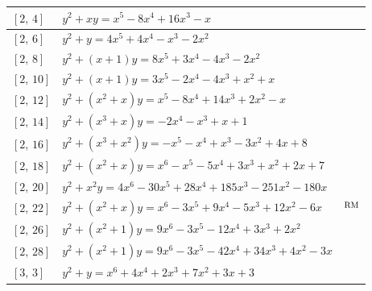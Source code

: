 \documentclass[11pt]{amsart}
\begin{document}
\begin{longtable}{|>{\raggedright\arraybackslash}p{1.7cm}|>{\raggedright\arraybackslash}p{}|>{\raggedright\arraybackslash}p{2.1cm}|}
$[2,\,4]$ & \href{https://www.lmfdb.org/Genus2Curve/Q/997/a/997/1}{$y^2 + xy = x^{5}-8x^{4}+16x^{3}-x$} & \cite{BSSVY}\\ \hline
$[2,\,6]$ & \href{https://www.lmfdb.org/Genus2Curve/Q/704/a/45056/1}{$y^2 + y = 4x^{5}+4x^{4}-x^{3}-2x^{2}$} & \cite{BSSVY}\\ \hline
$[2,\,8]$ & \href{https://www.lmfdb.org/Genus2Curve/Q/464/a/29696/1}{$y^2 + (x+1)y = 8x^{5}+3x^{4}-4x^{3}-2x^{2}$} & \cite{BSSVY}\\ \hline
$[2,\,10]$ & \href{https://www.lmfdb.org/Genus2Curve/Q/555/a/8325/1}{$y^2 + (x+1)y = 3x^{5}-2x^{4}-4x^{3}+x^{2}+x$} & \cite{BSSVY}\\ \hline
$[2,\,12]$ & \href{https://www.lmfdb.org/Genus2Curve/Q/762/a/82296/1}{$y^2 + (x^{2}+x)y = x^{5}-8x^{4}+14x^{3}+2x^{2}-x$} & \cite{BSSVY}\\ \hline
$[2,\,14]$ & \href{https://www.lmfdb.org/Genus2Curve/Q/1416/b/135936/1}{$y^2 + (x^{3}+x)y = -2x^{4}-x^{3}+x+1$} & \cite{BSSVY}\\ \hline
$[2,\,16]$ & \href{https://alpha.lmfdb.org/Genus2Curve/Q/?jump=[[8,4,-3,1,-1,-1],[0,0,1,1]]}{$y^2 + (x^{3}+x^{2})y = -x^{5}-x^{4}+x^{3}-3x^{2}+4x+8$} & \cite{BookerSutherland}\\ \hline
$[2,\,18]$ & \href{https://alpha.lmfdb.org/Genus2Curve/Q/?jump=[[7,2,1,3,-5,-1,1],[0,1,1]]}{$y^2 + (x^{2}+x)y = x^{6}-x^{5}-5x^{4}+3x^{3}+x^{2}+2x+7$} & \cite{BookerSutherland}\\ \hline
$[2,\,20]$ & \href{https://alpha.lmfdb.org/Genus2Curve/Q/?jump=[[0,-180,-251,185,28,-30,4],[0,0,1]]}{$y^2 + x^{2}y = 4x^{6}-30x^{5}+28x^{4}+185x^{3}-251x^{2}-180x$} & \cite{BookerSutherland}\\ \hline
$[2,\,22]$ & \href{https://alpha.lmfdb.org/Genus2Curve/Q/?jump=[[0,-6,12,-5,9,-3,1],[0,1,1]]}{$y^2 + (x^{2}+x)y = x^{6}-3x^{5}+9x^{4}-5x^{3}+12x^{2}-6x$} & \cite{BookerSutherland}$^{\rm RM}$\\ \hline
$[2,\,26]$ & \href{https://alpha.lmfdb.org/Genus2Curve/Q/?jump=[[0,0,2,3,-12,-3,9],[1,0,1]]}{$y^2 + (x^{2}+1)y = 9x^{6}-3x^{5}-12x^{4}+3x^{3}+2x^{2}$} & \cite{BookerSutherland}\\ \hline
$[2,\,28]$ & \href{https://alpha.lmfdb.org/Genus2Curve/Q/?jump=[[0,-3,4,34,-42,-3,9],[1,0,1]]}{$y^2 + (x^{2}+1)y = 9x^{6}-3x^{5}-42x^{4}+34x^{3}+4x^{2}-3x$} & \cite{BookerSutherland}\\ \hline
$[3,\,3]$ & \href{https://alpha.lmfdb.org/Genus2Curve/Q/?jump=[[3,3,7,2,4,0,1],[1]]}{$y^2 + y = x^{6}+4x^{4}+2x^{3}+7x^{2}+3x+3$} & \cite{BFT2014}\\ \hline

\end{longtable}
\end{document}
